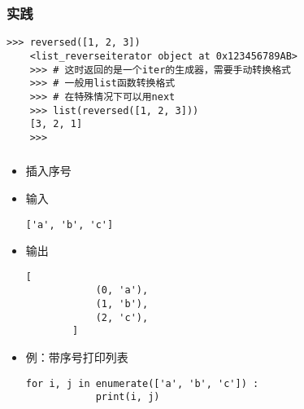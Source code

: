 \begin{frame} [fragile]
	\frametitle{实践}
	\linespread{1.25}
	\begin{lstlisting}[style=pythonstyle, gobble=4, texcl]
	>>> reversed([1, 2, 3])
	<list_reverseiterator object at 0x123456789AB>
	>>> # 这时返回的是一个iter的生成器，需要手动转换格式
	>>> # 一般用list函数转换格式
	>>> # 在特殊情况下可以用next
	>>> list(reversed([1, 2, 3]))
	[3, 2, 1]
	>>>
	\end{lstlisting}
\end{frame}

\begin{frame} [fragile]
	\frametitle{}
	\begin{itemize}
	\item {}插入序号
	\item 输入
		\begin{lstlisting}[style=pythonstyle, gobble=8, texcl]
		['a', 'b', 'c']
		\end{lstlisting}
	\item 输出
		\begin{lstlisting}[style=pythonstyle, gobble=8, texcl]
		[
			(0, 'a'),
			(1, 'b'),
			(2, 'c'),
		]
		\end{lstlisting}
	\item 例：带序号打印列表
		\begin{lstlisting}[style=pythonstyle, gobble=8, texcl]
		for i, j in enumerate(['a', 'b', 'c']) :
			print(i, j)
		\end{lstlisting}
	\end{itemize}
\end{frame}

